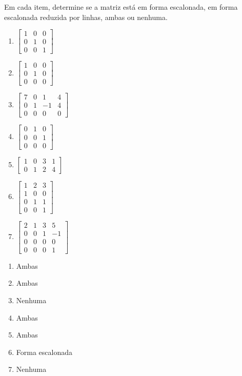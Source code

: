 \documentclass[12pt]{exam}
\begin{document}
\begin{exercicio}
  Em cada item, determine se a matriz está em forma escalonada, em forma escalonada reduzida por linhas, ambas ou nenhuma.
  \begin{multicols}{3}
  \begin{enumerate}
    \item $\begin{bmatrix}1 & 0 & 0\\0 & 1 & 0\\0 & 0 & 1\end{bmatrix}$
    \item $\begin{bmatrix}1 & 0 & 0\\0 & 1 & 0\\0 & 0 & 0\end{bmatrix}$
    \item $\begin{bmatrix}7 & 0 & 1 & 4\\0 & 1 & -1 & 4\\0 & 0 & 0 & 0\end{bmatrix}$
    \item $\begin{bmatrix}0 & 1 & 0\\0 & 0 & 1\\0 & 0 & 0\end{bmatrix}$
    \item $\begin{bmatrix}1 & 0 & 3 & 1\\0 & 1 & 2 & 4\end{bmatrix}$
    \item $\begin{bmatrix}1 & 2 & 3\\1 & 0 & 0\\0 & 1 & 1\\0 & 0 & 1\end{bmatrix}$
    \item $\begin{bmatrix}2 & 1 & 3 & 5\\0 & 0 & 1 & -1\\0 & 0 & 0 & 0\\0 & 0 & 0 & 1\end{bmatrix}$
  \end{enumerate}
\end{multicols}

  \begin{solucao}
    \begin{enumerate}
      \item Ambas
      \item Ambas
      \item Nenhuma
      \item Ambas
      \item Ambas
      \item Forma escalonada
      \item Nenhuma
    \end{enumerate}
  \end{solucao}
\end{exercicio}
\end{document}
